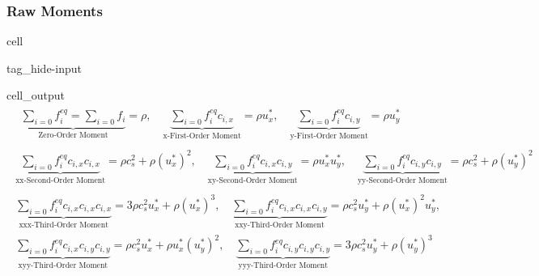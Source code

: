 \documentclass[letterpaper,10pt,english,openany,oneside]{jupyterBook}
\begin{document}
\subsubsection{Raw Moments}
\label{\detokenize{Refs/LBM-Study/intro-nse-lbm/Navier-Stokes-Equation:id3}}
\begin{sphinxuseclass}{cell}
\begin{sphinxuseclass}{tag_hide-input}\begin{sphinxVerbatimOutput}

\begin{sphinxuseclass}{cell_output}\begin{equation*}
\begin{split}\displaystyle \begin{gathered}\underbrace{\sum_{i=0} f_{i}^{eq} =\sum_{i=0} f_{i} }_{\textrm{Zero-Order Moment}} =\rho,\quad \underbrace{\sum_{i=0} f_{i}^{eq}c_{i,x} }_{\textrm{x-First-Order Moment}} =\rho u^{*}_{x},\quad \underbrace{\sum_{i=0} f_{i}^{eq}c_{i,y} }_{\textrm{y-First-Order Moment}} =\rho u^{*}_{y}\end{gathered}\end{split}
\end{equation*}\begin{equation*}
\begin{split}\displaystyle \begin{gathered}\underbrace{\sum_{i=0} f_{i}^{eq} c_{i,x}c_{i,x} }_{\textrm{xx-Second-Order Moment}} =\rho c_{s}^{2} + \rho \left(u^{*}_{x}\right)^{2},\quad \underbrace{\sum_{i=0} f_{i}^{eq} c_{i,x}c_{i,y} }_{\textrm{xy-Second-Order Moment}} =\rho u^{*}_{x} u^{*}_{y},\quad \underbrace{\sum_{i=0} f_{i}^{eq} c_{i,y}c_{i,y} }_{\textrm{yy-Second-Order Moment}} =\rho c_{s}^{2} + \rho \left(u^{*}_{y}\right)^{2}\end{gathered}\end{split}
\end{equation*}\begin{equation*}
\begin{split}\displaystyle \begin{gathered}\underbrace{\sum_{i=0} f_{i}^{eq} c_{i,x}c_{i,x}c_{i,x} }_{\textrm{xxx-Third-Order Moment}} =3 \rho c_{s}^{2} u^{*}_{x} + \rho \left(u^{*}_{x}\right)^{3},\quad \underbrace{\sum_{i=0} f_{i}^{eq} c_{i,x}c_{i,x}c_{i,y} }_{\textrm{xxy-Third-Order Moment}} =\rho c_{s}^{2} u^{*}_{y} + \rho \left(u^{*}_{x}\right)^{2} u^{*}_{y},\\[10pt]\underbrace{\sum_{i=0} f_{i}^{eq} c_{i,x}c_{i,y}c_{i,y} }_{\textrm{xyy-Third-Order Moment}} =\rho c_{s}^{2} u^{*}_{x} + \rho u^{*}_{x} \left(u^{*}_{y}\right)^{2},\quad \underbrace{\sum_{i=0} f_{i}^{eq} c_{i,y}c_{i,y}c_{i,y} }_{\textrm{yyy-Third-Order Moment}} =3 \rho c_{s}^{2} u^{*}_{y} + \rho \left(u^{*}_{y}\right)^{3}\end{gathered}\end{split}
\end{equation*}
\end{sphinxuseclass}\end{sphinxVerbatimOutput}

\end{sphinxuseclass}
\end{sphinxuseclass}
\end{document}
